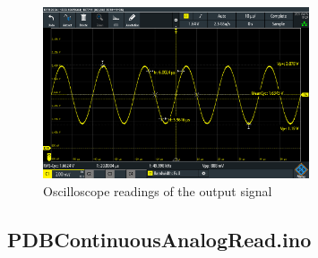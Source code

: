 \begin{figure}[h]
    \centering
    \includegraphics[width=0.70\textwidth]{graphics/ContAnalogReadOscillascope.PNG}
    \caption{Oscilloscope readings of the output signal}
    \label{fig:ContAnalOscillascope}
\end{figure}

\vspace{4cm}


\subsection{PDBContinuousAnalogRead.ino}

